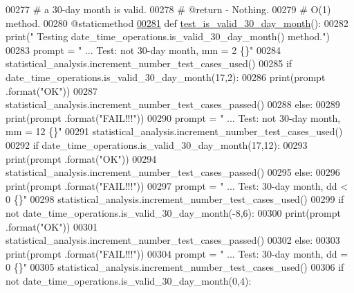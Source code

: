 \begin{DoxyCode}
00277     \textcolor{comment}{#       a 30-day month is valid.}
00278     \textcolor{comment}{#   @return - Nothing.}
00279     \textcolor{comment}{#   O(1) method.}
00280     @staticmethod
\hypertarget{date__time__processing__tester_8py_source_l00281}{}\hyperlink{classutilities_1_1date__time__processing__tester_1_1date__time__operations__tester_a1ffc03785cad6313ef55b291e1cbb3d9}{00281}     \textcolor{keyword}{def }\hyperlink{classutilities_1_1date__time__processing__tester_1_1date__time__operations__tester_a1ffc03785cad6313ef55b291e1cbb3d9}{test\_is\_valid\_30\_day\_month}():
00282         print(\textcolor{stringliteral}{" Testing date\_time\_operations.is\_valid\_30\_day\_month() method."})
00283         prompt = \textcolor{stringliteral}{"  ... Test: not 30-day month, mm = 2          \{\}"}
00284         statistical\_analysis.increment\_number\_test\_cases\_used()
00285         \textcolor{keywordflow}{if} date\_time\_operations.is\_valid\_30\_day\_month(17,2):
00286             print(prompt .format(\textcolor{stringliteral}{"OK"}))
00287             statistical\_analysis.increment\_number\_test\_cases\_passed()
00288         \textcolor{keywordflow}{else}:
00289             print(prompt .format(\textcolor{stringliteral}{"FAIL!!!"}))
00290         prompt = \textcolor{stringliteral}{"  ... Test: not 30-day month, mm = 12         \{\}"}
00291         statistical\_analysis.increment\_number\_test\_cases\_used()
00292         \textcolor{keywordflow}{if} date\_time\_operations.is\_valid\_30\_day\_month(17,12):
00293             print(prompt .format(\textcolor{stringliteral}{"OK"}))
00294             statistical\_analysis.increment\_number\_test\_cases\_passed()
00295         \textcolor{keywordflow}{else}:
00296             print(prompt .format(\textcolor{stringliteral}{"FAIL!!!"}))
00297         prompt = \textcolor{stringliteral}{"  ... Test: 30-day month, dd < 0              \{\}"}
00298         statistical\_analysis.increment\_number\_test\_cases\_used()
00299         \textcolor{keywordflow}{if} \textcolor{keywordflow}{not} date\_time\_operations.is\_valid\_30\_day\_month(-8,6):
00300             print(prompt .format(\textcolor{stringliteral}{"OK"}))
00301             statistical\_analysis.increment\_number\_test\_cases\_passed()
00302         \textcolor{keywordflow}{else}:
00303             print(prompt .format(\textcolor{stringliteral}{"FAIL!!!"}))
00304         prompt = \textcolor{stringliteral}{"  ... Test: 30-day month, dd = 0              \{\}"}
00305         statistical\_analysis.increment\_number\_test\_cases\_used()
00306         \textcolor{keywordflow}{if} \textcolor{keywordflow}{not} date\_time\_operations.is\_valid\_30\_day\_month(0,4):

\end{DoxyCode}
